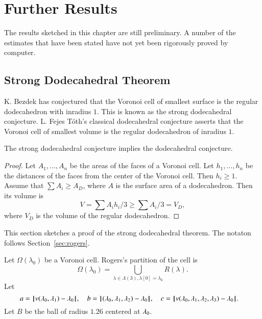 
\chapter{Further Results}

\begin{note}%
The results sketched in this chapter are still preliminary.  A number of the estimates that have been stated have not yet been rigorously proved by computer. 
\end{note}

\section{Strong Dodecahedral Theorem}

K. Bezdek has conjectured that the Voronoi cell of smallest surface is the regular dodecahedron with inradius $1$.  This is known as the strong dodecahedral conjecture.  L. Fejes T\'oth's classical dodecahedral conjecture asserts that the Voronoi cell of smallest volume is the regular dodecahedron of inradius $1$.
%
%
%
%


\begin{lemma}  The strong dodecahedral conjecture implies the dodecahedral conjecture.
\end{lemma}

\begin{proof}  Let $A_1,\ldots,A_n$ be the areas of the faces of a Voronoi cell.  Let $h_1,\ldots,h_n$ be the distances of the faces from the center of the Voronoi cell.  Then $h_i\ge 1$.  Assume that $\sum A_i \ge A_D$, where $A$ is the surface area of a dodecahedron.  Then its volume is
$$
V = \sum A_i h_i/3 \ge \sum A_i/3 = V_D,
$$
where $V_D$ is the volume of the regular dodecahedron.
\end{proof}
%
%
%

This section sketches a proof of the strong dodecahedral theorem.  The notaton follows Section~\ref{sec:rogers}.

Let $\Omega(\lambda_0)$ be a Voronoi cell.    Rogers's partition of the cell is
$$
\Omega(\lambda_0) = \bigcup_{\lambda\in \Lambda(3),\lambda[0]=\lambda_0 } R(\lambda).
$$
Let 
$$
a = {\hskip0.1em|\hskip-0.15em|\hskip0.1em} v(\lambda_0,\lambda_1) -   \lambda_0{\hskip0.1em|\hskip-0.15em|\hskip0.1em},\quad
b = {\hskip0.1em|\hskip-0.15em|\hskip0.1em}(\lambda_0,\lambda_1,\lambda_2) -  \lambda_0{\hskip0.1em|\hskip-0.15em|\hskip0.1em},\quad
c = {\hskip0.1em|\hskip-0.15em|\hskip0.1em} v(\lambda_0,\lambda_1,\lambda_2,\lambda_3) -   \lambda_0{\hskip0.1em|\hskip-0.15em|\hskip0.1em}.\quad
$$
Let $B$ be the ball of radius $1.26$ centered at $\lambda_0$.
%
%


